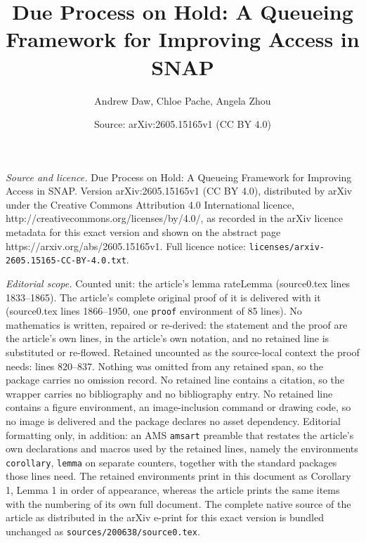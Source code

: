 \documentclass[10pt,a4paper]{amsart}
\title{Due Process on Hold: A Queueing Framework for Improving Access in SNAP}
\author{Andrew Daw, Chloe Pache, Angela Zhou}
\date{Source: arXiv:2605.15165v1 (CC BY 4.0)}
\begin{document}
\maketitle

\noindent\emph{Source and licence.} Due Process on Hold: A Queueing Framework for Improving Access in SNAP. Version arXiv:2605.15165v1 (CC BY 4.0), distributed by arXiv under the Creative Commons Attribution 4.0 International licence, http://creativecommons.org/licenses/by/4.0/, as recorded in the arXiv licence metadata for this exact version and shown on the abstract page https://arxiv.org/abs/2605.15165v1. Full licence notice: \texttt{licenses/arxiv-2605.15165-CC-BY-4.0.txt}.\par\smallskip

\noindent\textit{Editorial scope.} Counted unit: the article's lemma rateLemma (source0.tex lines 1833--1865). The article's complete original proof of it is delivered with it (source0.tex lines 1866--1950, one \texttt{proof} environment of 85 lines). No mathematics is written, repaired or re-derived: the statement and the proof are the article's own lines, in the article's own notation, and no retained line is substituted or re-flowed.  Retained uncounted as the source-local context the proof needs: lines 820--837.  Nothing was omitted from any retained span, so the package carries no omission record.  No retained line contains a citation, so the wrapper carries no bibliography and no bibliography entry.  No retained line contains a figure environment, an image-inclusion command or drawing code, so no image is delivered and the package declares no asset dependency.  Editorial formatting only, in addition: an AMS \texttt{amsart} preamble that restates the article's own declarations and macros used by the retained lines, namely the environments \texttt{corollary}, \texttt{lemma} on separate counters, together with the standard packages those lines need.  The retained environments print in this document as Corollary 1, Lemma 1 in order of appearance, whereas the article prints the same items with the numbering of its own full document.  The complete native source of the article as distributed in the arXiv e-print for this exact version is bundled unchanged as \texttt{sources/200638/source0.tex}.
\end{document}
